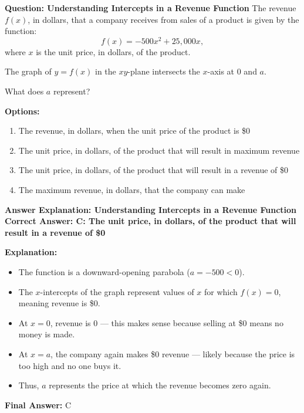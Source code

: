 \documentclass{beamer}
\begin{document}
\begin{frame}{\textbf{Question: Understanding Intercepts in a Revenue Function}}
\small
    The revenue \( f(x) \), in dollars, that a company receives from sales of a product is given by the function:
    \[
    f(x) = -500x^2 + 25{,}000x,
    \]
    where \(x\) is the unit price, in dollars, of the product.

    \vspace{0.3cm}
    The graph of \( y = f(x) \) in the \(xy\)-plane intersects the \(x\)-axis at \(0\) and \(a\).

    \vspace{0.3cm}
    What does \(a\) represent?

    \vspace{0.5cm}
    \textbf{Options:}
    \begin{enumerate}
        \item[A] The revenue, in dollars, when the unit price of the product is \$0
        \item[B] The unit price, in dollars, of the product that will result in maximum revenue
        \item[C] The unit price, in dollars, of the product that will result in a revenue of \$0
        \item[D] The maximum revenue, in dollars, that the company can make
    \end{enumerate}
\end{frame}

\begin{frame}{\textbf{Answer Explanation: Understanding Intercepts in a Revenue Function}}
    \textbf{Correct Answer: \textcolor{novelGreen}{C: The unit price, in dollars, of the product that will result in a revenue of \$0}}

    \vspace{0.3cm}
    \textbf{Explanation:}
    \begin{itemize}
        \item The function is a downward-opening parabola (\(a = -500 < 0\)).
        \item The \(x\)-intercepts of the graph represent values of \(x\) for which \(f(x) = 0\), meaning revenue is \$0.
        \item At \(x = 0\), revenue is 0 — this makes sense because selling at \$0 means no money is made.
        \item At \(x = a\), the company again makes \$0 revenue — likely because the price is too high and no one buys it.
        \item Thus, \(a\) represents the price at which the revenue becomes zero again.
    \end{itemize}

    \textbf{Final Answer:} \( \boxed{\text{C}} \)
\end{frame}
\end{document}
